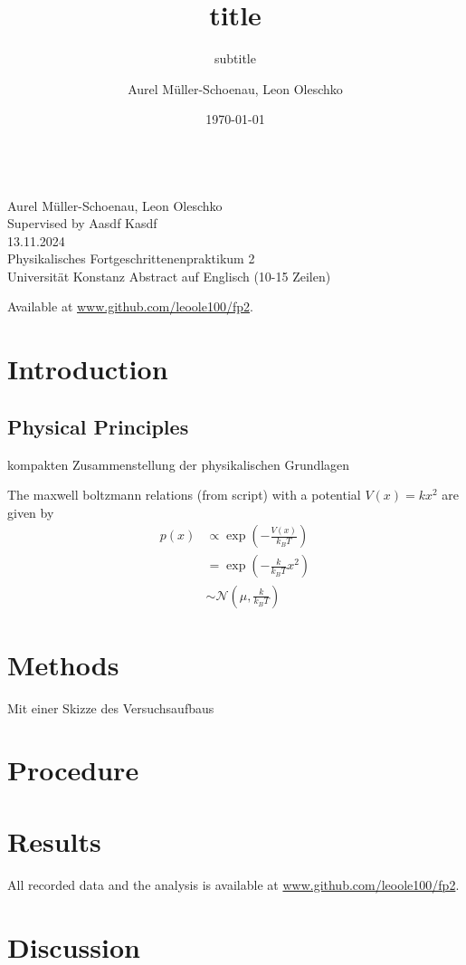 \documentclass[
    parskip=half, 
    twoside=false,
    twocolumn=true,
    fontsize=11pt,
]{scrarticle}
\begin{document}
\title{title}
\subtitle{subtitle}
\author{Aurel Müller-Schoenau, Leon Oleschko}
\date{\dotdate\today}


\begin{titlepage}
    \sffamily
    \vspace*{3cm}
    {
        \fontsize{32}{32}
    }
    \vspace{.25cm}\\
    {
        \Large
        Aurel Müller-Schoenau, Leon Oleschko\\
        Supervised by Aasdf Kasdf
        \vspace{.05cm}\\
        13.11.2024
        \vspace{.25cm}\\
        \normalsize
        Physikalisches Fortgeschrittenenpraktikum 2\\
        Universität Konstanz
    }
    \vfill
    {
        \normalfont\normalsize
        Abstract auf Englisch (10-15 Zeilen)
        \blindtext[2]
    }
    \vfill
    \begin{flushright}
        Available at \url{www.github.com/leoole100/fp2}.
    \end{flushright}
\end{titlepage}

\section{Introduction}

\subsection{Physical Principles}
kompakten Zusammenstellung der physikalischen Grundlagen

The maxwell boltzmann relations (from script) with a potential $V(x) = k x^2$ are given by
\begin{align}
    p(x) &\propto \exp\left(- \frac{V(x)}{k_B T}\right)\\
    &= \exp\left(-\frac{k}{k_B T} x^2\right)\\
    &\sim \mathcal{N}\left(\mu, \frac{k}{k_B T}\right)
\end{align}


\section{Methods}
Mit einer Skizze des Versuchsaufbaus

\section{Procedure}

\pagebreak
\section{Results}

All recorded data and the analysis is available at \url{www.github.com/leoole100/fp2}.

\pagebreak
\section{Discussion}
\end{document}
